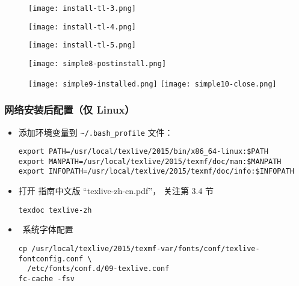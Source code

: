 \begin{frame}
  \begin{figure}[h]
    \centering
    \texttt{[image: install-tl-3.png]}
  \end{figure}
\end{frame}


\begin{frame}
  \begin{figure}[h]
    \centering
    \texttt{[image: install-tl-4.png]}
  \end{figure}
\end{frame}

\begin{frame}
  \begin{figure}[h]
    \centering
    \texttt{[image: install-tl-5.png]}
  \end{figure}
\end{frame}

\begin{frame}
  \begin{figure}[h]
    \centering
    \texttt{[image: simple8-postinstall.png]}
  \end{figure}
\end{frame}

\begin{frame}
  \begin{figure}[h]
    \centering
    \texttt{[image: simple9-installed.png]}%
    \hspace{2em}
    \texttt{[image: simple10-close.png]}
  \end{figure}
\end{frame}

\begin{frame}[fragile]
  \frametitle{网络安装后配置（仅 Linux）}
  \begin{itemize}
    \item
      添加环境变量到 \nolinkurl{~/.bash_profile} 文件：
      \begin{verbatim}
export PATH=/usr/local/texlive/2015/bin/x86_64-linux:$PATH
export MANPATH=/usr/local/texlive/2015/texmf/doc/man:$MANPATH
export INFOPATH=/usr/local/texlive/2015/texmf/doc/info:$INFOPATH
      \end{verbatim}

  \item
    打开 \TeXLive 指南中文版 ``texlive-zh-cn.pdf''，
    关注第 3.4 节
      \begin{verbatim}
texdoc texlive-zh
    \end{verbatim}
  \item
    \XeTeX\ 系统字体配置
    \begin{verbatim}
cp /usr/local/texlive/2015/texmf-var/fonts/conf/texlive-fontconfig.conf \
  /etc/fonts/conf.d/09-texlive.conf
fc-cache -fsv
    \end{verbatim}

  \end{itemize}
\end{frame}

